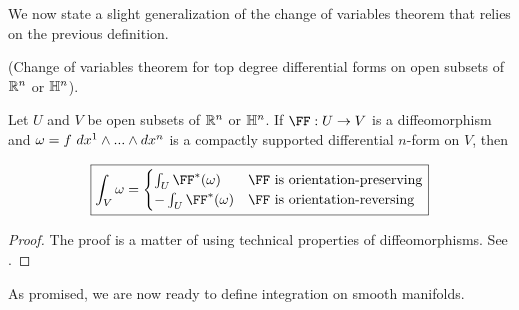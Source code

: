 We now state a slight generalization of the change of variables theorem that relies on the previous definition.

\begin{theorem}
     (Change of variables theorem for top degree differential forms on open subsets of $\mathbb{R}^n$ or $\mathbb{H}^n$).
    
    Let $U$ and $V$ be open subsets of $\mathbb{R}^n$ or $\mathbb{H}^n$. If $\FF:U \rightarrow V$ is a diffeomorphism and $\omega = f \text{ } dx^1 \wedge ... \wedge dx^n$ is a compactly supported differential $n$-form on $V$, then
    
    \begin{align*}
        \boxed
        {
            \int_V \omega
            =
            \begin{cases}
                \int_U \FF^*(\omega) & \text{$\FF$ is orientation-preserving} \\
                -\int_U \FF^*(\omega) & \text{$\FF$ is orientation-reversing}
            \end{cases}
        }
    \end{align*}
\end{theorem}

\begin{proof}
    The proof is a matter of using technical properties of diffeomorphisms. See \cite[p. 404]{book::SM}.
\end{proof}

As promised, we are now ready to define integration on smooth manifolds.

